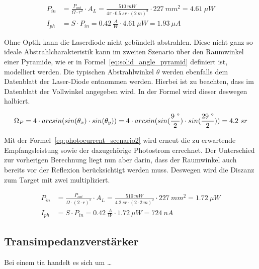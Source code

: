\begin{equation}\label{eq:photocurrent_scenario1}
    \begin{split}
        P_{in} &= \frac{P_{out}}{\Omega \cdot r^2} \cdot A_{L} = \frac{510~mW}{4\pi \cdot 0.5~sr \cdot (2~m)^2} \cdot 227~mm^2 = 4.61~\mu W\\
        I_{ph} &= S \cdot P_{in} = 0.42~\frac{A}{W} \cdot 4.61~\mu W = 1.93~\mu A
    \end{split}
\end{equation}
\myequations{}

Ohne Optik kann die Laserdiode nicht gebündelt abstrahlen. Diese nicht ganz so ideale Abstrahlcharakteristik kann im
zweiten Szenario über den Raumwinkel einer Pyramide, wie er in Formel~\ref{eq:solid_angle_pyramid} definiert ist,
modelliert werden. Die typischen Abstrahlwinkel $\theta$ werden ebenfalls dem Datenblatt der Laser-Diode
entnommen werden. Hierbei ist zu beachten, dass im Datenblatt der Vollwinkel angegeben wird. In der Formel wird dieser
deswegen halbiert.

\begin{equation}\label{eq:solid_angle_pyramid}
    \Omega_{P} = 4 \cdot arcsin(sin(\theta_x) \cdot sin(\theta_y)) =  4 \cdot arcsin(sin(\frac{9~\degree}{2} ) \cdot sin(\frac{29~\degree}{2})) = 4.2~sr
\end{equation}

Mit der Formel~\ref{eq:photocurrent_scenario2} wird erneut die zu erwartende Empfangsleistung sowie der dazugehörige
Photostrom errechnet. Der Unterschied zur vorherigen Berechnung liegt nun aber darin, dass der Raumwinkel auch bereits
vor der Reflexion berücksichtigt werden muss. Deswegen wird die Diszanz zum Target mit zwei multipliziert.

\begin{equation}\label{eq:photocurrent_scenario2}
    \begin{split}
        P_{in} &= \frac{P_{out}}{\Omega \cdot (2 \cdot r)^2} \cdot A_{L} = \frac{510~mW}{4.2~sr \cdot (2 \cdot 2~m)^2} \cdot 227~mm^2 = 1.72~\mu W\\
        I_{ph} &= S \cdot P_{in} = 0.42~\frac{A}{W} \cdot 1.72~\mu W = 724~nA
    \end{split}
\end{equation}
\myequations{}

\pagebreak

\subsection{Transimpedanzverstärker}

Bei einem \acrfull{tia} handelt es sich um \dots
